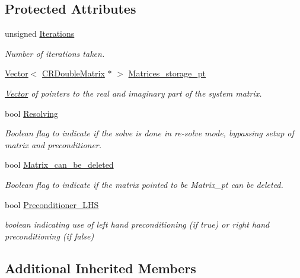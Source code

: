 \subsection*{Protected Attributes}
\begin{DoxyCompactItemize}
\item 
unsigned \hyperlink{classoomph_1_1HelmholtzGMRESMG_ae2a4718545bd42acb57aba5baa23d52f}{Iterations}
\begin{DoxyCompactList}\small\item\em Number of iterations taken. \end{DoxyCompactList}\item 
\hyperlink{classoomph_1_1Vector}{Vector}$<$ \hyperlink{classoomph_1_1CRDoubleMatrix}{C\+R\+Double\+Matrix} $\ast$ $>$ \hyperlink{classoomph_1_1HelmholtzGMRESMG_a5d8ae2181aecf890386ae48d81f90b42}{Matrices\+\_\+storage\+\_\+pt}
\begin{DoxyCompactList}\small\item\em \hyperlink{classoomph_1_1Vector}{Vector} of pointers to the real and imaginary part of the system matrix. \end{DoxyCompactList}\item 
bool \hyperlink{classoomph_1_1HelmholtzGMRESMG_acb64519b62c16bbec32d01c9969f746f}{Resolving}
\begin{DoxyCompactList}\small\item\em Boolean flag to indicate if the solve is done in re-\/solve mode, bypassing setup of matrix and preconditioner. \end{DoxyCompactList}\item 
bool \hyperlink{classoomph_1_1HelmholtzGMRESMG_a1550b5147f7fa822e8cbc9de93f1c06f}{Matrix\+\_\+can\+\_\+be\+\_\+deleted}
\begin{DoxyCompactList}\small\item\em Boolean flag to indicate if the matrix pointed to be Matrix\+\_\+pt can be deleted. \end{DoxyCompactList}\item 
bool \hyperlink{classoomph_1_1HelmholtzGMRESMG_a7f151e92397721fc2ae6acdd8253d685}{Preconditioner\+\_\+\+L\+HS}
\begin{DoxyCompactList}\small\item\em boolean indicating use of left hand preconditioning (if true) or right hand preconditioning (if false) \end{DoxyCompactList}\end{DoxyCompactItemize}
\subsection*{Additional Inherited Members}


